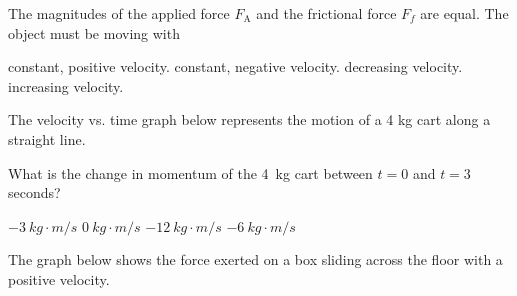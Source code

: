 \documentclass[]{exam}
\begin{document}
\begin{questions}
The magnitudes of the applied force $F_\mathrm{A}$ and the frictional force $F_f$ are equal. The object must be moving with 

\begin{randomizechoices}
    \correctchoice constant, positive velocity.
    \choice constant, negative velocity.
    \choice decreasing velocity.
    \choice increasing velocity.
\end{randomizechoices}

\clearpage

\question
The velocity vs. time graph below represents the motion of a 4 kg cart along a straight line.

\begin{center}
\end{center}

What is the change in momentum of the \SI{4}{kg} cart between $t = 0$ and $t = 3$ seconds?

\begin{randomizechoices}
    \choice $\SI{-3}{kg\cdot m/s}$
    \choice $\SI{0}{kg\cdot m/s}$
    \correctchoice $\SI{-12}{kg\cdot m/s}$
    \choice $\SI{-6}{kg\cdot m/s}$
\end{randomizechoices}

\question
The graph below shows the force exerted on a box sliding across the floor with a positive velocity.

\begin{center}
\end{center}


\end{questions}
\end{document}
